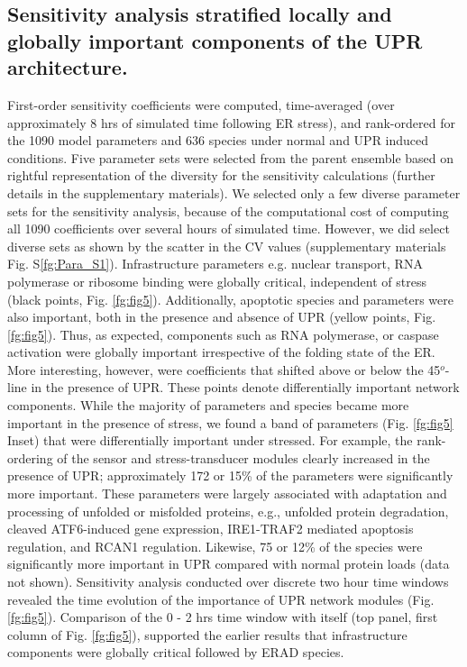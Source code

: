 \documentclass[fleqn,10pt]{wlscirep}
\begin{document}
\subsection*{Sensitivity analysis stratified locally and globally important components of the UPR architecture.}
First-order sensitivity coefficients were computed, time-averaged (over approximately 8 hrs of simulated time following ER stress), and rank-ordered for the 1090 model parameters and 636 species under normal and UPR induced conditions.
Five parameter sets were selected from the parent ensemble based on rightful representation of the diversity for the sensitivity calculations (further details in the supplementary materials).
We selected only a few diverse parameter sets for the sensitivity analysis, because of the computational cost of computing all 1090 coefficients over several hours of simulated time.
However, we did select diverse sets as shown by the scatter in the CV values (supplementary materials Fig. S\ref{fg:Para_S1}).
Infrastructure parameters e.g. nuclear transport, RNA polymerase or ribosome binding were globally critical, independent of stress (black points, Fig. \ref{fg:fig5}).
Additionally, apoptotic species and parameters were also important, both in the presence and absence of UPR (yellow points, Fig. \ref{fg:fig5}).
Thus, as expected, components such as RNA polymerase, or caspase activation were globally important irrespective of the folding state of the ER.
More interesting, however, were coefficients that shifted above or below the 45$^{o}$-line in the presence of UPR.
These points denote differentially important network components.
While the majority of parameters and species became more important in the presence of stress, we found a band of parameters (Fig. \ref{fg:fig5} Inset) that were differentially important under stressed.
For example, the rank-ordering of the sensor and stress-transducer modules clearly increased in the presence of UPR; approximately 172 or 15\% of the parameters were significantly more important.
These parameters were largely associated with adaptation and processing of unfolded or misfolded proteins, e.g., unfolded protein degradation, cleaved ATF6-induced gene expression, IRE1-TRAF2 mediated apoptosis regulation, and RCAN1 regulation.
Likewise, 75 or 12\% of the species were significantly more important in UPR compared with normal protein loads (data not shown).
Sensitivity analysis conducted over discrete two hour time windows revealed the time evolution of the importance of UPR network modules (Fig. \ref{fg:fig5}).
Comparison of the 0 - 2 hrs time window with itself (top panel, first column of Fig. \ref{fg:fig5}), supported the earlier results that infrastructure components were globally critical followed by ERAD species.
\end{document}
